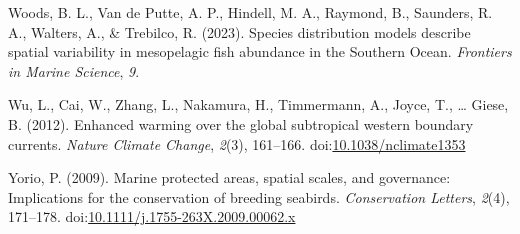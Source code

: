 \documentclass[
]{article}
\newlength{\cslhangindent}
\newlength{\cslentryspacingunit} %
\newenvironment{CSLReferences}[2] %
 {%
  \setlength{\parindent}{0pt}
  \ifodd #1
  \let\oldpar\par
  \def\par{\hangindent=\cslhangindent\oldpar}
  \fi
  \setlength{\parskip}{#2\cslentryspacingunit}
 }%
 {}
\begin{document}
\begin{CSLReferences}{1}{0}
\leavevmode{}%
Woods, B. L., Van de Putte, A. P., Hindell, M. A., Raymond, B.,
Saunders, R. A., Walters, A., \& Trebilco, R. (2023). Species
distribution models describe spatial variability in mesopelagic fish
abundance in the {Southern Ocean}. \emph{Frontiers in Marine Science},
\emph{9}.

\leavevmode{}%
Wu, L., Cai, W., Zhang, L., Nakamura, H., Timmermann, A., Joyce, T.,
\ldots{} Giese, B. (2012). Enhanced warming over the global subtropical
western boundary currents. \emph{Nature Climate Change}, \emph{2}(3),
161--166.
doi:\href{https://doi.org/10.1038/nclimate1353}{10.1038/nclimate1353}

\leavevmode{}%
Yorio, P. (2009). Marine protected areas, spatial scales, and
governance: Implications for the conservation of breeding seabirds.
\emph{Conservation Letters}, \emph{2}(4), 171--178.
doi:\href{https://doi.org/10.1111/j.1755-263X.2009.00062.x}{10.1111/j.1755-263X.2009.00062.x}

\end{CSLReferences}
\end{document}
